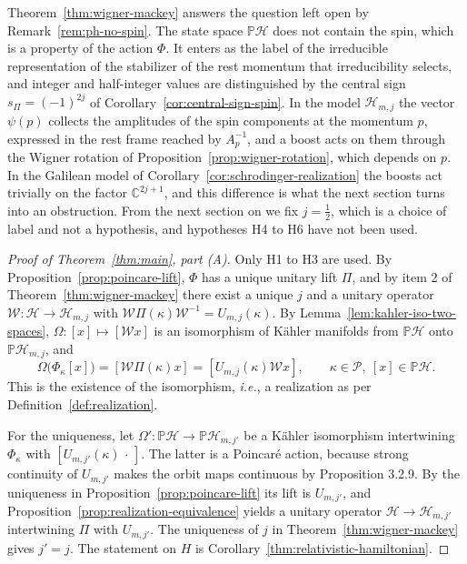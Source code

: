 \begin{remark}\label{rem:spin-emerges}
	Theorem~\ref{thm:wigner-mackey} answers the question left open by Remark~\ref{rem:ph-no-spin}. The state space $\mathbb{P}\mathcal{H}$ does not contain the spin, which is a property of the action $\Phi$. It enters as the label of the irreducible representation of the stabilizer of the rest momentum that irreducibility selects, and integer and half-integer values are distinguished by the central sign $s_\Pi=(-1)^{2j}$ of Corollary~\ref{cor:central-sign-spin}. In the model $\mathcal{H}_{m,j}$ the vector $\psi(p)$ collects the amplitudes of the spin components at the momentum $p$, expressed in the rest frame reached by $A_p^{-1}$, and a boost acts on them through the Wigner rotation of Proposition~\ref{prop:wigner-rotation}, which depends on $p$. In the Galilean model of Corollary~\ref{cor:schrodinger-realization} the boosts act trivially on the factor $\mathbb{C}^{2j+1}$, and this difference is what the next section turns into an obstruction. From the next section on we fix $j=\tfrac12$, which is a choice of label and not a hypothesis, and hypotheses H4 to H6 have not been used.
\end{remark}

\begin{proof}[Proof of Theorem~\ref{thm:main}, part (A)]
	Only H1 to H3 are used. By Proposition~\ref{prop:poincare-lift}, $\Phi$ has a unique unitary lift $\Pi$, and by item 2 of Theorem~\ref{thm:wigner-mackey} there exist a unique $j$ and a unitary operator $\mathcal{W}:\mathcal{H}\to\mathcal{H}_{m,j}$ with $\mathcal{W}\Pi(\kappa)\mathcal{W}^{-1}=U_{m,j}(\kappa)$. By Lemma~\ref{lem:kahler-iso-two-spaces}, $\Omega:[x]\mapsto[\mathcal{W}x]$ is an isomorphism of Kähler manifolds from $\mathbb{P}\mathcal{H}$ onto $\mathbb{P}\mathcal{H}_{m,j}$, and
	\begin{equation*}
		\Omega\big(\Phi_\kappa[x]\big)=[\mathcal{W}\Pi(\kappa)x]=[U_{m,j}(\kappa)\mathcal{W}x],\qquad \kappa\in\mathcal{P},\ [x]\in\mathbb{P}\mathcal{H}.
	\end{equation*}
	This is the existence of the isomorphism, \textit{i.e.}, a realization as per Definition~\ref{def:realization}.
	
	For the uniqueness, let $\Omega':\mathbb{P}\mathcal{H}\to\mathbb{P}\mathcal{H}_{m,j'}$ be a Kähler isomorphism intertwining $\Phi_\kappa$ with $[U_{m,j'}(\kappa)\,\cdot\,]$. The latter is a Poincar\'e action, because strong continuity of $U_{m,j'}$ makes the orbit maps continuous by Proposition 3.2.9. By the uniqueness in Proposition~\ref{prop:poincare-lift} its lift is $U_{m,j'}$, and Proposition~\ref{prop:realization-equivalence} yields a unitary operator $\mathcal{H}\to\mathcal{H}_{m,j'}$ intertwining $\Pi$ with $U_{m,j'}$. The uniqueness of $j$ in Theorem~\ref{thm:wigner-mackey} gives $j'=j$. The statement on $H$ is Corollary~\ref{thm:relativistic-hamiltonian}.
\end{proof}


